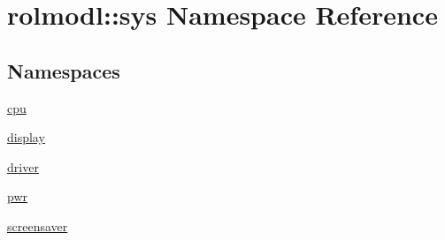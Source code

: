 \hypertarget{namespacerolmodl_1_1sys}{}\section{rolmodl\+::sys Namespace Reference}
\label{namespacerolmodl_1_1sys}
\subsection*{Namespaces}
\begin{DoxyCompactItemize}
\item 
 \mbox{\hyperlink{namespacerolmodl_1_1sys_1_1cpu}{cpu}}
\item 
 \mbox{\hyperlink{namespacerolmodl_1_1sys_1_1display}{display}}
\item 
 \mbox{\hyperlink{namespacerolmodl_1_1sys_1_1driver}{driver}}
\item 
 \mbox{\hyperlink{namespacerolmodl_1_1sys_1_1pwr}{pwr}}
\item 
 \mbox{\hyperlink{namespacerolmodl_1_1sys_1_1screensaver}{screensaver}}
\end{DoxyCompactItemize}
